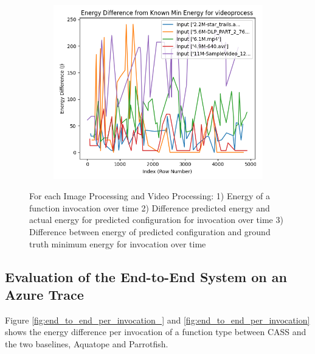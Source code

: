 \documentclass[times, 10pt,twocolumn]{article}
\begin{document}
\begin{figure}[ht]
\begin{subfigure}[b]{0.22\textwidth}
     \caption{}
     \label{fig:video_energy_diff}
   \end{subfigure}
   \hfill
   \begin{subfigure}[b]{0.22\textwidth}
      \includegraphics[width=\textwidth]{imgs/final_experiment_plots/model_analysis/measurement_data_analysis/video_compare_min.png}
     \caption{}
     \label{fig:video_compare_min}
   \end{subfigure}
   
   \caption{For each Image Processing and Video Processing: 1) Energy of a function invocation over time 2) Difference predicted energy and actual energy for predicted configuration for invocation over time 3) Difference between energy of predicted configuration and ground truth minimum energy for invocation over time}
   \label{fig:model_performance_measurement_study}
 \end{figure}


  
 \subsection{Evaluation of the End-to-End System on an Azure Trace}
 \label{appendix:end-to-end_analysis}

 Figure \ref{fig:end_to_end_per_invocation_} and \ref{fig:end_to_end_per_invocation} shows the energy difference per invocation of a function type between CASS and the two baselines, Aquatope and Parrotfish. 
\end{document}
